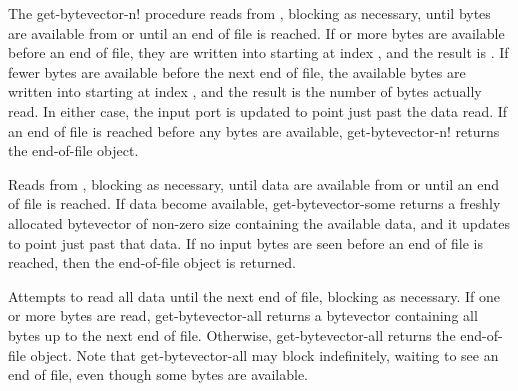 \begin{entry}{%
}

   
The {\cf get-bytevector-n!} procedure reads from ,
blocking as necessary, until
 bytes are available from  or until
an end of file is
reached. If  or more bytes are available before an end of file,
they are written into  starting at index , and
the result is . If fewer bytes are available before
the next end of file, the available bytes are written into 
starting at index , and the result is the number of bytes actually
read. In either case, the input port is updated to point just past the
data read. If an end of file is reached before any bytes
are available, {\cf get-bytevector-n!} returns the end-of-file object.
\end{entry}

\begin{entry}{%
}
   
Reads from , blocking as necessary, until data are
available from  or until an end of file is reached.
If data become available,
{\cf get-bytevector-some} returns a freshly allocated
bytevector of non-zero size containing the available data, and it updates
 to point just past that data.
If no input bytes are seen before an end
of file is reached, then the end-of-file object is returned.
\end{entry}

\begin{entry}{%
}
   
Attempts to read all data until the next end of file, blocking as
necessary. If one or more bytes are read, {\cf get-bytevector-all} returns
a bytevector
containing all bytes up to the next end of file.  Otherwise, {\cf
  get-bytevector-all} returns the end-of-file object.
Note that  {\cf get-bytevector-all}
may block indefinitely, waiting to see an end of
file, even though some bytes are available.
\end{entry}


